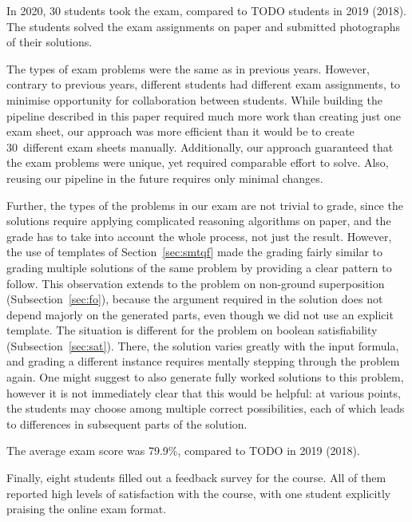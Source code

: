 In 2020, 30 students took the exam, compared to TODO students in 2019 (2018).
The students solved the exam assignments on paper and submitted photographs of their
solutions.

The types of exam problems were the same as in previous years.
However, contrary to previous years, different students had different exam
assignments, to minimise opportunity for collaboration between students.
%
While building the pipeline described in this paper required much more work
than creating just one exam sheet, our approach was more efficient than
it would be to create 30~different exam sheets manually. Additionally,
our approach guaranteed that the exam problems were
unique, yet required comparable effort to solve.
Also, reusing our pipeline in the future requires only minimal changes.

Further, the types of the problems in our exam are not trivial to grade, since
the solutions require applying complicated reasoning algorithms on paper, and
the grade has to take into account the whole process, not just the result.
However, the use of templates of Section~\ref{sec:smtqf}
made the grading fairly similar to grading multiple
solutions of the same problem by providing a clear pattern to follow.
%
This observation extends to %
the problem on non-ground superposition (Subsection~\ref{sec:fo}),
because the argument required in the solution does not depend majorly on the generated parts,
even though we did not use an explicit template.
%
The situation is different for %
the problem on boolean satisfiability (Subsection~\ref{sec:sat}).
There, the solution varies greatly with the input formula,
and grading a different instance requires mentally stepping through the problem again.
One might suggest to also generate fully worked solutions to this problem,
however it is not immediately clear that this would be helpful:
at various points, the students may choose among multiple correct possibilities,
each of which leads to differences in subsequent parts of the solution.

The average exam score was 79.9\%, compared to TODO in 2019 (2018).

Finally, eight students filled out a feedback survey for the course. All of them reported
high levels of satisfaction with the course, with one student explicitly praising the
online exam format.
